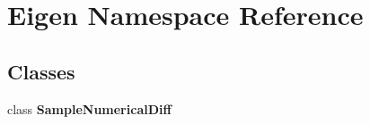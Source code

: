 \section{\-Eigen \-Namespace \-Reference}
\label{namespaceEigen}
\subsection*{\-Classes}
\begin{DoxyCompactItemize}
\item 
class {\bf \-Sample\-Numerical\-Diff}
\end{DoxyCompactItemize}
